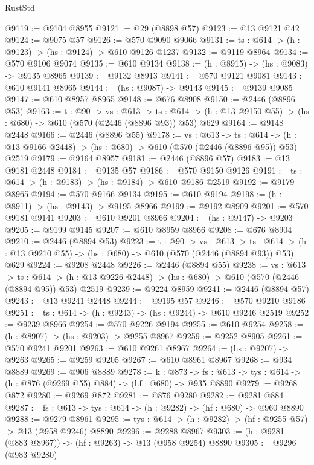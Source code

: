 \begin{lexlean}{RustStd}
\begin{coremodule}
@9119 := @9104 @8955
@9121 := @29 (@8898 @57)
@9123 := @13 @9121 @42
@9124 := @9075 @57
@9126 := @570 @9090 @9066
@9131 := {ts : @614} -> (h : @9123) -> (hs : @9124) -> @610 @9126 @1237
@9132 := @9119 @8964
@9134 := @570 @9106 @9074
@9135 := @610 @9134
@9138 := (h : @8915) -> (hs : @9083) -> @9135 @8965
@9139 := @9132 @8913
@9141 := @570 @9121 @9081
@9143 := @610 @9141 @8965
@9144 := (hs : @9087) -> @9143
@9145 := @9139 @9085
@9147 := @610 @8957 @8965
@9148 := @676 @8908
@9150 := @2446 (@8896 @53)
@9163 := {t : @90} ->
  {vs : @613} ->
  {ts : @614} -> (h : @13 @9150 @55) -> (hs : @680) -> @610 (@570 (@2446 (@8896 @93)) @53) @629
@9164 := @9148 @2448
@9166 := @2446 (@8896 @55)
@9178 := {vs : @613} ->
  {ts : @614} -> (h : @13 @9166 @2448) -> (hs : @680) -> @610 (@570 (@2446 (@8896 @95)) @53) @2519
@9179 := @9164 @8957
@9181 := @2446 (@8896 @57)
@9183 := @13 @9181 @2448
@9184 := @9135 @57
@9186 := @570 @9150 @9126
@9191 := {ts : @614} -> (h : @9183) -> (hs : @9184) -> @610 @9186 @2519
@9192 := @9179 @8965
@9194 := @570 @9166 @9134
@9195 := @610 @9194
@9198 := (h : @8911) -> (hs : @9143) -> @9195 @8966
@9199 := @9192 @8909
@9201 := @570 @9181 @9141
@9203 := @610 @9201 @8966
@9204 := (hs : @9147) -> @9203
@9205 := @9199 @9145
@9207 := @610 @8959 @8966
@9208 := @676 @8904
@9210 := @2446 (@8894 @53)
@9223 := {t : @90} ->
  {vs : @613} ->
  {ts : @614} -> (h : @13 @9210 @55) -> (hs : @680) -> @610 (@570 (@2446 (@8894 @93)) @53) @629
@9224 := @9208 @2448
@9226 := @2446 (@8894 @55)
@9238 := {vs : @613} ->
  {ts : @614} -> (h : @13 @9226 @2448) -> (hs : @680) -> @610 (@570 (@2446 (@8894 @95)) @53) @2519
@9239 := @9224 @8959
@9241 := @2446 (@8894 @57)
@9243 := @13 @9241 @2448
@9244 := @9195 @57
@9246 := @570 @9210 @9186
@9251 := {ts : @614} -> (h : @9243) -> (hs : @9244) -> @610 @9246 @2519
@9252 := @9239 @8966
@9254 := @570 @9226 @9194
@9255 := @610 @9254
@9258 := (h : @8907) -> (hs : @9203) -> @9255 @8967
@9259 := @9252 @8905
@9261 := @570 @9241 @9201
@9263 := @610 @9261 @8967
@9264 := (hs : @9207) -> @9263
@9265 := @9259 @9205
@9267 := @610 @8961 @8967
@9268 := @934 @8889
@9269 := @906 @8889
@9278 := {k : @873} ->
  {fs : @613} -> {tys : @614} -> (h : @876 (@9269 @55) @884) -> (hf : @680) -> @935 @8890
@9279 := @9268 @872
@9280 := @9269 @872
@9281 := @876 @9280
@9282 := @9281 @884
@9287 := {fs : @613} -> {tys : @614} -> (h : @9282) -> (hf : @680) -> @960 @8890
@9288 := @9279 @8961
@9295 := {tys : @614} -> (h : @9282) -> (hf : @9255 @57) -> @13 (@958 @9246) @8890
@9296 := @9288 @8967
@9303 := (h : @9281 (@883 @8967)) -> (hf : @9263) -> @13 (@958 @9254) @8890
@9305 := @9296 (@983 @9280)

\end{coremodule}
\end{lexlean}
